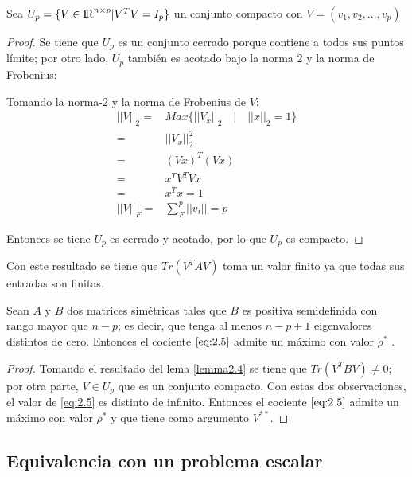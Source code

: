 \begin{lemma}
Sea $U_p = \{ V \in {\rm I\!R}^{n \times p} | V^T V = I_p \} $ un conjunto compacto con $V = (v_1, v_2, ... , v_p)$
\end{lemma}
\begin{proof}
Se tiene que $U_p$ es un conjunto cerrado porque contiene a todos sus puntos límite; por otro lado, $U_p$ también es acotado bajo la norma 2 y la norma de Frobenius:

Tomando la norma-2 y la norma de Frobenius de $V$: 
\begin{equation*}
\begin{aligned}
	||V||_2 =& Max \{||V_x ||_2 \quad | \quad ||x||_2 = 1 \} \\
		    =& ||V_x||^2_2  \\
		    =& (Vx)^T (Vx) \\
		    =& x^T V^T V x\\
		    =& x^T x = 1\\
	||V||_F	=& \sum\limits_{F}^{p} ||v_i|| = p   
\end{aligned}
\end{equation*}

Entonces se tiene $U_p$ es cerrado y acotado, por lo que $U_p$ es compacto.
\end{proof}

Con este resultado se tiene que $Tr(V^T A V)$ toma un valor finito ya que todas sus entradas son finitas. 


\begin{lemma}\label{lemma2.5}
Sean $A$ y $B$ dos matrices simétricas tales que $B$ es positiva semidefinida con rango mayor que $n-p$; es decir, que tenga al menos $n-p+1$ eigenvalores distintos de cero. Entonces el cociente $\ref{eq:2.5}$ admite un máximo con valor $\rho^*$ \cite{ngo2012trace}.
\end{lemma}

\begin{proof}
Tomando el resultado del lema \ref{lemma2.4} se tiene que $Tr(V^T B V) \neq 0$; por otra parte, $V \in U_p$ que es un conjunto compacto. Con estas dos observaciones, el valor de \ref{eq:2.5} es distinto de infinito. Entonces el cociente $\ref{eq:2.5}$ admite un máximo con valor $\rho^*$ y que tiene como argumento $V^{**}$.
\end{proof}

\subsection{Equivalencia con un problema escalar}

